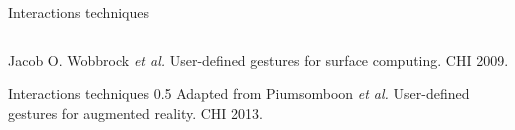 \begin{frame}{Interactions techniques}
  \begin{columns}
    \begin{column}{0.22\textwidth}\end{column}
    \begin{column}{0.36\textwidth}\end{column}
    \begin{column}{0.42\textwidth}\end{column}
  \end{columns}
  Jacob O. Wobbrock \textit{et al.} User-defined gestures for surface computing. CHI 2009.
\end{frame}

\begin{frame}{Interactions techniques}
          {0.5}{}
  Adapted from Piumsomboon \textit{et al.} User-defined gestures for augmented reality. CHI 2013.
\end{frame}